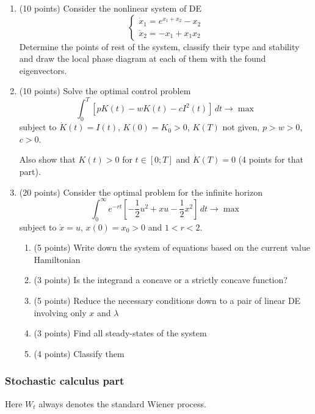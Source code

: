 \documentclass[pdftex,12pt,a4paper]{article}
\begin{document}
\begin{enumerate}
\item (10 points) Consider the nonlinear system of DE
\[
\begin{cases}
\dot{x}_1=e^{x_1+x_2}-x_2 \\
\dot{x}_2=-x_1+x_1x_2
\end{cases}
\]
Determine the points of rest of the system, classify their type and stability and draw the local 
phase diagram at each of them with the found eigenvectors.

\item (10 points) Solve the optimal control problem 
\[
\int_0^T \left[ pK(t)-wK(t)-cI^2(t)  \right] \, dt \to \max
\]
subject to $\dot{K}(t)=I(t)$, $K(0)=K_0>0$, $K(T)$ not given, $p>w>0$, $c>0$. 


Also show that $K(t)>0$ for $t\in [0;T]$ and $\dot{K}(T)=0$ (4 points for that part).

\item (20 points) Consider the optimal problem for the infinite horizon 
\[
\int_0^{\infty} e^{-rt}\left[ -\frac{1}{2}u^2+xu-\frac{1}{2}x^2  \right] \, dt \to \max
\]
subject to $\dot{x}=u$, $x(0)=x_0>0$ and $1<r<2$.

\begin{enumerate}
\item  (5 points) Write down the system of equations based on the current value Hamiltonian
\item  (3 points) Is the integrand a concave or a strictly concave function?
\item  (5 points) Reduce the necessary conditions down to a pair of linear DE involving only $x$ and $\lambda$
\item  (3 points) Find all steady-states of the system
\item  (4 points) Classify them
\end{enumerate}
\end{enumerate}


\subsubsection*{Stochastic calculus part}



Here $W_t$ always denotes the standard Wiener process. 

\vspace{10pt}
\end{document}

